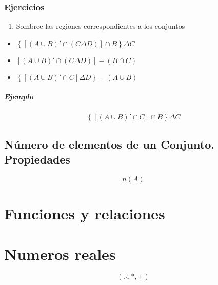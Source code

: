 \documentclass[16pt,]{krantz}
\providecommand{\tightlist}{%
  \setlength{\itemsep}{0pt}\setlength{\parskip}{0pt}}
\theoremstyle{definition}
\theoremstyle{definition}
\theoremstyle{definition}
\theoremstyle{definition}
\theoremstyle{remark}
\begin{document}
\hypertarget{ejercicios-1}{%
\subsection{Ejercicios}\label{ejercicios-1}}

\begin{enumerate}
\def\labelenumi{\arabic{enumi}.}
\tightlist
\item
  Sombree las regiones correspondientes a los conjuntos
\end{enumerate}

\begin{itemize}
\item
  \(\left\{ \left[ \left( A\cup B \right)'\cap \left( C \Delta D \right) \right] \cap B \right\} \Delta C\)
\item
  \(\left[ \left( A\cup B \right)'\cap \left( C \Delta D \right) \right]-\left( B\cap C \right)\)
\item
  \(\left\{ \left[ \left( A\cup B \right)'\cap C \right] \Delta D \right\} -\left( A\cup B \right)\)
\end{itemize}

\hypertarget{ejemplo}{%
\paragraph{Ejemplo}\label{ejemplo}}

\[ \left\{  \left[ \left( A\cup B \right)'\cap  C \right] \cap B \right\} \Delta C \]

\hypertarget{nuxfamero-de-elementos-de-un-conjunto.-propiedades}{%
\section{Número de elementos de un Conjunto. Propiedades}\label{nuxfamero-de-elementos-de-un-conjunto.-propiedades}}

\[
n(A)
\]

\hypertarget{funciones-y-relaciones}{%
\chapter{Funciones y relaciones}\label{funciones-y-relaciones}}

\hypertarget{numeros-reales}{%
\chapter{Numeros reales}\label{numeros-reales}}

\[(\mathbb{R}, *, +)\]
\end{document}
